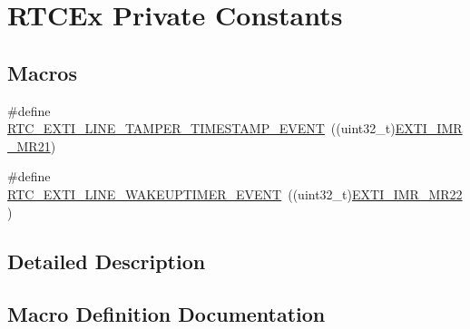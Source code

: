 \hypertarget{group___r_t_c_ex___private___constants}{}\section{R\+T\+C\+Ex Private Constants}
\label{group___r_t_c_ex___private___constants}
\subsection*{Macros}
\begin{DoxyCompactItemize}
\item 
\#define \hyperlink{group___r_t_c_ex___private___constants_gaffa3448885f1dec216899aef7f49471f}{R\+T\+C\+\_\+\+E\+X\+T\+I\+\_\+\+L\+I\+N\+E\+\_\+\+T\+A\+M\+P\+E\+R\+\_\+\+T\+I\+M\+E\+S\+T\+A\+M\+P\+\_\+\+E\+V\+E\+NT}~((uint32\+\_\+t)\hyperlink{group___peripheral___registers___bits___definition_ga3cc7e64c45d273ca7396ac1e0ce38c36}{E\+X\+T\+I\+\_\+\+I\+M\+R\+\_\+\+M\+R21})
\item 
\#define \hyperlink{group___r_t_c_ex___private___constants_ga1a1a58e244663850786c387bfa5474f2}{R\+T\+C\+\_\+\+E\+X\+T\+I\+\_\+\+L\+I\+N\+E\+\_\+\+W\+A\+K\+E\+U\+P\+T\+I\+M\+E\+R\+\_\+\+E\+V\+E\+NT}~((uint32\+\_\+t)\hyperlink{group___peripheral___registers___bits___definition_ga2aec84941d816be18a1607b6ee25acb1}{E\+X\+T\+I\+\_\+\+I\+M\+R\+\_\+\+M\+R22})
\end{DoxyCompactItemize}


\subsection{Detailed Description}


\subsection{Macro Definition Documentation}
